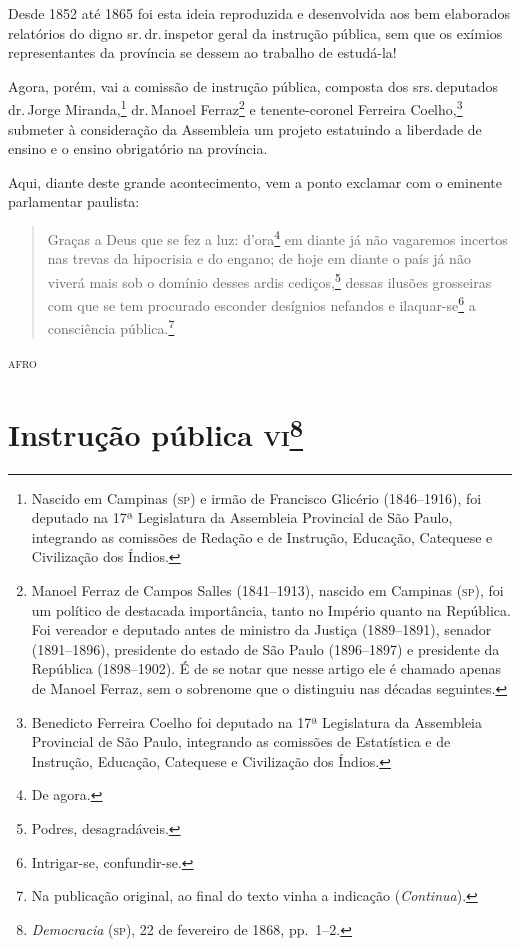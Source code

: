 Desde 1852 até 1865 foi esta ideia reproduzida e desenvolvida aos bem
elaborados relatórios do digno sr.\,dr.\,inspetor geral da instrução
pública, sem que os exímios representantes da província se dessem ao
trabalho de estudá-la!

Agora, porém, vai a comissão de instrução pública, composta dos srs.\,deputados dr.\,Jorge Miranda,\footnote{Nascido em Campinas (\textsc{sp}) e irmão
  de Francisco Glicério (1846--1916), foi deputado na 17ª Legislatura da
  Assembleia Provincial de São Paulo, integrando as comissões de Redação
  e de Instrução, Educação, Catequese e Civilização dos Índios.} dr.\,Manoel Ferraz\footnote{Manoel Ferraz de Campos Salles (1841--1913),
  nascido em Campinas (\textsc{sp}), foi um político de destacada importância,
  tanto no Império quanto na República. Foi vereador e deputado antes de
  ministro da Justiça (1889--1891), senador (1891--1896), presidente do
  estado de São Paulo (1896--1897) e presidente da República (1898--1902).
  É de se notar que nesse artigo ele é chamado apenas de Manoel Ferraz,
  sem o sobrenome que o distinguiu nas décadas seguintes.} e
tenente-coronel Ferreira Coelho,\footnote{Benedicto Ferreira Coelho foi
  deputado na 17ª Legislatura da Assembleia Provincial de São Paulo,
  integrando as comissões de Estatística e de Instrução, Educação,
  Catequese e Civilização dos Índios.} submeter à consideração da
Assembleia um projeto estatuindo a liberdade de ensino e o ensino
obrigatório na província.

Aqui, diante deste grande acontecimento, vem a ponto exclamar com o
eminente parlamentar paulista:

\begin{quote}
Graças a Deus que se fez a luz: d'ora\footnote{De agora.} em diante
já não vagaremos incertos nas trevas da hipocrisia e do engano; de hoje
em diante o país já não viverá mais sob o domínio desses ardis
cediços,\footnote{Podres, desagradáveis.} dessas ilusões grosseiras
com que se tem procurado esconder desígnios nefandos e
ilaquar-se\footnote{Intrigar-se, confundir-se.} a consciência
pública.\footnote{Na publicação original, ao final do texto vinha a indicação (\emph{Continua}).}
\end{quote}

\begin{flushright}
\textsc{afro}
\end{flushright}

\chapter{Instrução pública \textsc{vi}\footnote{\emph{Democracia} (\textsc{sp}),
  22 de fevereiro de 1868, pp.~1--2.}} %

